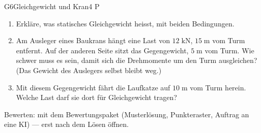 \documentclass[11pt]{article}
\begin{document}
\begin{lpaufgabe}{G6}{Gleichgewicht und Kran}{4 P}
\begin{enumerate}[label=\alph*),leftmargin=*,itemsep=2pt,topsep=2pt]
\item Erkläre, was statisches Gleichgewicht heisst, mit beiden Bedingungen.
\item Am Ausleger eines Baukrans hängt eine Last von \(12\;\text{kN}\), \(15\;\text{m}\) vom Turm entfernt. Auf der anderen Seite sitzt das Gegengewicht, \(5\;\text{m}\) vom Turm. Wie schwer muss es sein, damit sich die Drehmomente um den Turm ausgleichen? (Das Gewicht des Auslegers selbst bleibt weg.)
\item Mit diesem Gegengewicht fährt die Laufkatze auf \(10\;\text{m}\) vom Turm herein. Welche Last darf sie dort für Gleichgewicht tragen?
\end{enumerate}\par\smallskip
\begin{center}\end{center}
\end{lpaufgabe}

\vfill
{\small\color{lpgrau}Bewerten: mit dem Bewertungspaket (Musterlösung, Punkteraster, Auftrag an eine KI) — erst nach dem Lösen öffnen.}
\end{document}
